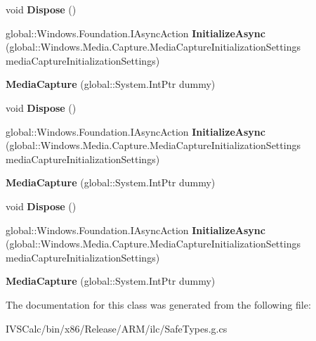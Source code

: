 \begin{DoxyCompactItemize}
void {\bfseries Dispose} ()
\item 
\mbox{\label{class_windows_1_1_media_1_1_capture_1_1_media_capture_abb4da1ecbe4e67ab5200a83e3f5caf76}} 
global\+::\+Windows.\+Foundation.\+I\+Async\+Action {\bfseries Initialize\+Async} (global\+::\+Windows.\+Media.\+Capture.\+Media\+Capture\+Initialization\+Settings media\+Capture\+Initialization\+Settings)
\item 
\mbox{\label{class_windows_1_1_media_1_1_capture_1_1_media_capture_ad8d682747c4f4cc0015b3c2023307b3d}} 
{\bfseries Media\+Capture} (global\+::\+System.\+Int\+Ptr dummy)
\item 
\mbox{\label{class_windows_1_1_media_1_1_capture_1_1_media_capture_a11b0e769ad1d6fc6ab7fa7063257316c}} 
void {\bfseries Dispose} ()
\item 
\mbox{\label{class_windows_1_1_media_1_1_capture_1_1_media_capture_abb4da1ecbe4e67ab5200a83e3f5caf76}} 
global\+::\+Windows.\+Foundation.\+I\+Async\+Action {\bfseries Initialize\+Async} (global\+::\+Windows.\+Media.\+Capture.\+Media\+Capture\+Initialization\+Settings media\+Capture\+Initialization\+Settings)
\item 
\mbox{\label{class_windows_1_1_media_1_1_capture_1_1_media_capture_ad8d682747c4f4cc0015b3c2023307b3d}} 
{\bfseries Media\+Capture} (global\+::\+System.\+Int\+Ptr dummy)
\item 
\mbox{\label{class_windows_1_1_media_1_1_capture_1_1_media_capture_a11b0e769ad1d6fc6ab7fa7063257316c}} 
void {\bfseries Dispose} ()
\item 
\mbox{\label{class_windows_1_1_media_1_1_capture_1_1_media_capture_abb4da1ecbe4e67ab5200a83e3f5caf76}} 
global\+::\+Windows.\+Foundation.\+I\+Async\+Action {\bfseries Initialize\+Async} (global\+::\+Windows.\+Media.\+Capture.\+Media\+Capture\+Initialization\+Settings media\+Capture\+Initialization\+Settings)
\item 
\mbox{\label{class_windows_1_1_media_1_1_capture_1_1_media_capture_ad8d682747c4f4cc0015b3c2023307b3d}} 
{\bfseries Media\+Capture} (global\+::\+System.\+Int\+Ptr dummy)
\end{DoxyCompactItemize}


The documentation for this class was generated from the following file\+:\begin{DoxyCompactItemize}
\item 
I\+V\+S\+Calc/bin/x86/\+Release/\+A\+R\+M/ilc/Safe\+Types.\+g.\+cs\end{DoxyCompactItemize}

